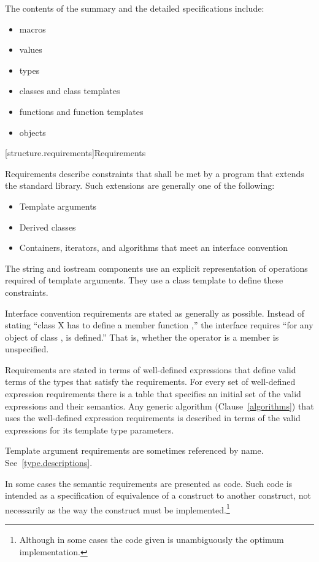 \pnum
The contents of the summary and the detailed specifications include:

\begin{itemize}
\item macros
\item values
\item types
\item classes and class templates
\item functions and function templates
\item objects
\end{itemize}

[structure.requirements]{Requirements}

\pnum
{}%
Requirements describe constraints that shall be met by a \Cpp program that extends the standard library.
Such extensions are generally one of the following:

\begin{itemize}
\item Template arguments
\item Derived classes
\item Containers, iterators, and algorithms that meet an interface convention
\end{itemize}

\pnum
The string and iostream components use an explicit representation of operations
required of template arguments. They use a class template  to
define these constraints.

\pnum
Interface convention requirements are stated as generally as possible. Instead
of stating ``class X has to define a member function ,'' the
interface requires ``for any object  of class ,  is
defined.'' That is, whether the operator is a member is unspecified.

\pnum
Requirements are stated in terms of well-defined expressions that define valid terms of
the types that satisfy the requirements. For every set of well-defined expression
requirements there is a table that specifies an initial set of the valid expressions and
their semantics. Any generic algorithm (Clause~\ref{algorithms}) that uses the
well-defined expression requirements is described in terms of the valid expressions for
its template type parameters.

\pnum
Template argument requirements are sometimes referenced by name.
See~\ref{type.descriptions}.

\pnum
In some cases the semantic requirements are presented as \Cpp code.
Such code is intended as a
specification of equivalence of a construct to another construct, not
necessarily as the way the construct
must be implemented.\footnote{Although in some cases the code given is
unambiguously the optimum implementation.}

